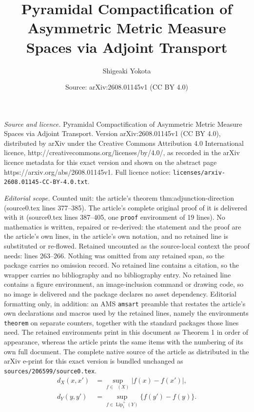\documentclass[10pt,a4paper]{amsart}
\title{Pyramidal Compactification of Asymmetric Metric Measure Spaces via Adjoint Transport}
\author{Shigeaki Yokota}
\date{Source: arXiv:2608.01145v1 (CC BY 4.0)}
\DeclareMathOperator{\lipone}{Lip_1}
\newcommand{\lipplus}{\operatorname{Lip}^{+}_{1}}
\begin{document}
\maketitle

\noindent\emph{Source and licence.} Pyramidal Compactification of Asymmetric Metric Measure Spaces via Adjoint Transport. Version arXiv:2608.01145v1 (CC BY 4.0), distributed by arXiv under the Creative Commons Attribution 4.0 International licence, http://creativecommons.org/licenses/by/4.0/, as recorded in the arXiv licence metadata for this exact version and shown on the abstract page https://arxiv.org/abs/2608.01145v1. Full licence notice: \texttt{licenses/arxiv-2608.01145-CC-BY-4.0.txt}.\par\smallskip

\noindent\textit{Editorial scope.} Counted unit: the article's theorem thm:adjunction-direction (source0.tex lines 377--385). The article's complete original proof of it is delivered with it (source0.tex lines 387--405, one \texttt{proof} environment of 19 lines). No mathematics is written, repaired or re-derived: the statement and the proof are the article's own lines, in the article's own notation, and no retained line is substituted or re-flowed.  Retained uncounted as the source-local context the proof needs: lines 263--266.  Nothing was omitted from any retained span, so the package carries no omission record.  No retained line contains a citation, so the wrapper carries no bibliography and no bibliography entry.  No retained line contains a figure environment, an image-inclusion command or drawing code, so no image is delivered and the package declares no asset dependency.  Editorial formatting only, in addition: an AMS \texttt{amsart} preamble that restates the article's own declarations and macros used by the retained lines, namely the environments \texttt{theorem} on separate counters, together with the standard packages those lines need.  The retained environments print in this document as Theorem 1 in order of appearance, whereas the article prints the same items with the numbering of its own full document.  The complete native source of the article as distributed in the arXiv e-print for this exact version is bundled unchanged as \texttt{sources/206599/source0.tex}.
\begin{align}
d_X(x,x')&=\sup_{f\in\lipone(X)}|f(x)-f(x')|,\label{eq:symmetric-recovery}\\
d_Y(y,y')&=\sup_{f\in\lipplus(Y)}\{f(y')-f(y)\}.\label{eq:directed-recovery}
\end{align}
\end{document}
